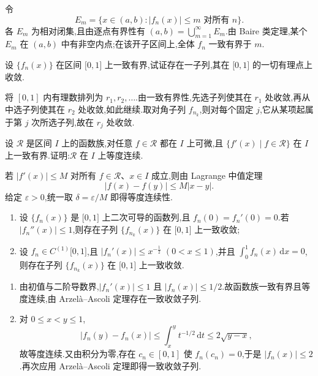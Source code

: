 \begin{solution}
    令
    \[
        E_m=\{x\in(a,b):|f_n(x)|\leq m\text{ 对所有 }n\}.
    \]
    各 $E_m$ 为相对闭集,且由逐点有界性有 $(a,b)=\bigcup_{m=1}^{\infty}E_m$.由 Baire 类定理,某个 $E_m$ 在 $(a,b)$ 中有非空内点;在该开子区间上,全体 $f_n$ 一致有界于 $m$.
\end{solution}

\begin{example}
    设 $\{f_n(x)\}$ 在区间 $\lbrack 0,1\rbrack$ 上一致有界,试证存在一子列,其在 $\lbrack 0,1\rbrack$ 的一切有理点上收敛.
\end{example}
\exampleblank

\begin{solution}
    将 $[0,1]$ 内有理数排列为 $r_1,r_2,\ldots$.由一致有界性,先选子列使其在 $r_1$ 处收敛,再从中选子列使其在 $r_2$ 处收敛,如此继续.取对角子列 $f_{n_k}$,则对每个固定 $j$,它从某项起属于第 $j$ 次所选子列,故在 $r_j$ 处收敛.
\end{solution}

\begin{example}
    设 $\mathscr R$ 是区间 $I$ 上的函数族,对任意 $f\in\mathscr R$ 都在 $I$ 上可微,且 $\{f'(x)\mid f\in\mathscr R\}$ 在 $I$ 上一致有界.证明:$\mathscr R$ 在 $I$ 上等度连续.
\end{example}
\exampleblank

\begin{solution}
    若 $|f'(x)|\leq M$ 对所有 $f\in\mathscr R$、$x\in I$ 成立,则由 Lagrange 中值定理
    \[
        |f(x)-f(y)|\leq M|x-y|.
    \]
    给定 $\varepsilon>0$,统一取 $\delta=\varepsilon/M$ 即得等度连续性.
\end{solution}

\begin{example}
    \begin{enumerate}
        \item 设 $\{f_n(x)\}$ 是 $\lbrack 0,1\rbrack$ 上二次可导的函数列,且 $f_n(0)=f_n'(0)=0$.若 $|f_n''(x)|\leq1$,则存在子列 $\{f_{n_k}(x)\}$ 在 $\lbrack 0,1\rbrack$ 上一致收敛;
        \item 设 $f_n\in C^{(1)}\lbrack 0,1\rbrack$,且 $|f_n'(x)|\leq x^{-\frac{1}{2}}$ $(0<x\leq1)$,并且 $\displaystyle\int_0^1f_n(x)\,\mathrm{d}x=0$,则存在子列 $\{f_{n_k}(x)\}$ 在 $\lbrack 0,1\rbrack$ 上一致收敛.
    \end{enumerate}
\end{example}
\exampleblank

\begin{solution}
    \begin{enumerate}
        \item 由初值与二阶导数界,$|f_n'(x)|\leq1$ 且 $|f_n(x)|\leq1/2$.故函数族一致有界且等度连续,由 Arzel\`a--Ascoli 定理存在一致收敛子列.
        \item 对 $0\leq x<y\leq1$,
              \[
                  |f_n(y)-f_n(x)|\leq\int_x^yt^{-1/2}\,\mathrm{d}t
                  \leq2\sqrt{y-x},
              \]
              故等度连续.又由积分为零,存在 $c_n\in[0,1]$ 使 $f_n(c_n)=0$,于是 $|f_n(x)|\leq2$.再次应用 Arzel\`a--Ascoli 定理即得一致收敛子列.
    \end{enumerate}
\end{solution}


